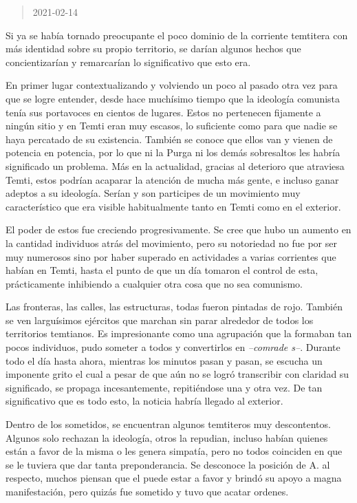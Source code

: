 \documentclass[
  spanish,
]{book}
\begin{document}
\begin{quote}
2021-02-14
\end{quote}

Si ya se había tornado preocupante el poco dominio de la corriente temtitera con más identidad sobre su propio territorio, se darían algunos hechos que concientizarían y remarcarían lo significativo que esto era.

En primer lugar contextualizando y volviendo un poco al pasado otra vez para que se logre entender, desde hace muchísimo tiempo que la ideología comunista tenía sus portavoces en cientos de lugares. Estos no pertenecen fijamente a ningún sitio y en Temti eran muy escasos, lo suficiente como para que nadie se haya percatado de su existencia. También se conoce que ellos van y vienen de potencia en potencia, por lo que ni la Purga ni los demás sobresaltos les habría significado un problema. Más en la actualidad, gracias al deterioro que atraviesa Temti, estos podrían acaparar la atención de mucha más gente, e incluso ganar adeptos a su ideología. Serían y son participes de un movimiento muy característico que era visible habitualmente tanto en Temti como en el exterior.

El poder de estos fue creciendo progresivamente. Se cree que hubo un aumento en la cantidad individuos atrás del movimiento, pero su notoriedad no fue por ser muy numerosos sino por haber superado en actividades a varias corrientes que habían en Temti, hasta el punto de que un día tomaron el control de esta, prácticamente inhibiendo a cualquier otra cosa que no sea comunismo.

Las fronteras, las calles, las estructuras, todas fueron pintadas de rojo. También se ven larguísimos ejércitos que marchan sin parar alrededor de todos los territorios temtianos.
Es impresionante como una agrupación que la formaban tan pocos individuos, pudo someter a todos y convertirlos en \emph{--comrade s--}. Durante todo el día hasta ahora, mientras los minutos pasan y pasan, se escucha un imponente grito el cual a pesar de que aún no se logró transcribir con claridad su significado, se propaga incesantemente, repitiéndose una y otra vez. De tan significativo que es todo esto, la noticia habría llegado al exterior.

Dentro de los sometidos, se encuentran algunos temtiteros muy descontentos. Algunos solo rechazan la ideología, otros la repudian, incluso habían quienes están a favor de la misma o les genera simpatía, pero no todos coinciden en que se le tuviera que dar tanta preponderancia. Se desconoce la posición de A. al respecto, muchos piensan que el puede estar a favor y brindó su apoyo a magna manifestación, pero quizás fue sometido y tuvo que acatar ordenes.
\end{document}
